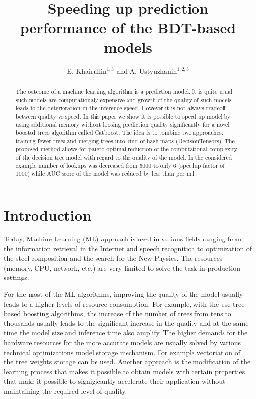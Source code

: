 \documentclass[a4paper]{jpconf}
\begin{document}
\title{Speeding up prediction performance of the BDT-based models}

\author{
 E. Khairullin$^{1, 3}$
 and
 A. Ustyuzhanin$^{1, 2, 3}$
}
\address{$^{1}$ Moscow Institute of Physics and Technology}
\address{$^{2}$ National Research University Higher School of Economics, 20 Myasnitskaya st., Moscow 101000, Russia}
\address{$^{3}$ Yandex School of Data Analysis, 11/2, Timura Frunze st., Moscow 119021, Russia}


\begin{abstract}
The outcome of a machine learning algorithm is a prediction model. It is quite usual such models are computationaly expensive and growth of the quality of such models leads to the deterioration in the inference speed. However it is not always tradeoff between quality vs speed. In this paper we show it is possible to speed up model by using additional memory without loosing prediction quality significantly for a novel boosted trees algorithm called Catboost. The idea is to combine two approaches: training fewer trees and merging trees into kind of hash maps (DecisionTensors). The proposed method allows for pareto-optimal reduction of the computational complexity of the decision tree model with regard to the quality of the model. In the considered example number of lookups was decreased from 5000 to only 6 (speedup factor of 1000) while AUC score of the model was reduced by less than per mil.
\end{abstract}

\section{Introduction}
Today, Machine Learning (ML) approach is used in various fields ranging from the information retrieval in the Internet and speech recognition to optimization of the steel composition and the search for the New Physics.
The resources (memory, CPU, network, etc.) are very limited to solve the task in production settings.

For the most of the ML algorithms, improving the quality of the model usually leads to a higher levels of resource consumption. For example, with the use tree-based boosting algorithms, the increase of the number of trees from tens to thousands usually leads to the significant increase in the quality and at the same time the model size and inference time also amplify. The higher demands for the hardware resources for the more accurate models are usually solved by various technical optimizations model storage mechanism. For example vectoriation of the tree weights storage can be used. Another approach is the modification of the learning process that makes it possible to obtain models with certain properties that make it possible to signigicantly accelerate their application without maintaining the required level of quality.
\end{document}

